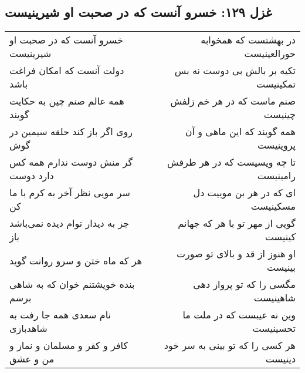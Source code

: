 \begin{center}
\section*{غزل ۱۲۹: خسرو آنست که در صحبت او شیرینیست}
\label{sec:129}
\begin{longtable}{l p{0.5cm} r}
خسرو آنست که در صحبت او شیرینیست
&&
در بهشتست که همخوابه حورالعینیست
\\
دولت آنست که امکان فراغت باشد
&&
تکیه بر بالش بی دوست نه بس تمکینیست
\\
همه عالم صنم چین به حکایت گویند
&&
صنم ماست که در هر خم زلفش چینیست
\\
روی اگر باز کند حلقه سیمین در گوش
&&
همه گویند که این ماهی و آن پروینیست
\\
گر منش دوست ندارم همه کس دارد دوست
&&
تا چه ویسیست که در هر طرفش رامینیست
\\
سر مویی نظر آخر به کرم با ما کن
&&
ای که در هر بن موییت دل مسکینیست
\\
جز به دیدار توام دیده نمی‌باشد باز
&&
گویی از مهر تو با هر که جهانم کینیست
\\
هر که ماه ختن و سرو روانت گوید
&&
او هنوز از قد و بالای تو صورت بینیست
\\
بنده خویشتنم خوان که به شاهی برسم
&&
مگسی را که تو پرواز دهی شاهینیست
\\
نام سعدی همه جا رفت به شاهدبازی
&&
وین نه عیبست که در ملت ما تحسینیست
\\
کافر و کفر و مسلمان و نماز و من و عشق
&&
هر کسی را که تو بینی به سر خود دینیست
\\
\end{longtable}
\end{center}
